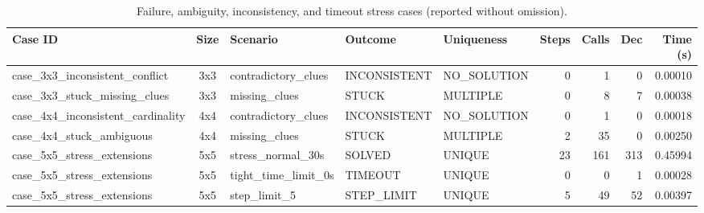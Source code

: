 \begin{table}[h!]
\centering
\scriptsize
\begin{tabular}{|l|c|l|l|l|r|r|r|r|}
\hline
\textbf{Case ID} & \textbf{Size} & \textbf{Scenario} & \textbf{Outcome} & \textbf{Uniqueness} & \textbf{Steps} & \textbf{Calls} & \textbf{Dec} & \textbf{Time (s)} \\ \hline
case\_3x3\_inconsistent\_conflict & 3x3 & contradictory\_clues & INCONSISTENT & NO_SOLUTION & 0 & 1 & 0 & 0.00010 \\ \hline
case\_3x3\_stuck\_missing\_clues & 3x3 & missing\_clues & STUCK & MULTIPLE & 0 & 8 & 7 & 0.00038 \\ \hline
case\_4x4\_inconsistent\_cardinality & 4x4 & contradictory\_clues & INCONSISTENT & NO_SOLUTION & 0 & 1 & 0 & 0.00018 \\ \hline
case\_4x4\_stuck\_ambiguous & 4x4 & missing\_clues & STUCK & MULTIPLE & 2 & 35 & 0 & 0.00250 \\ \hline
case\_5x5\_stress\_extensions & 5x5 & stress\_normal\_30s & SOLVED & UNIQUE & 23 & 161 & 313 & 0.45994 \\ \hline
case\_5x5\_stress\_extensions & 5x5 & tight\_time\_limit\_0s & TIMEOUT & UNIQUE & 0 & 0 & 1 & 0.00028 \\ \hline
case\_5x5\_stress\_extensions & 5x5 & step\_limit\_5 & STEP_LIMIT & UNIQUE & 5 & 49 & 52 & 0.00397 \\ \hline
\end{tabular}
\caption{Failure, ambiguity, inconsistency, and timeout stress cases (reported without omission).}
\label{tab:edge_cases}
\end{table}
